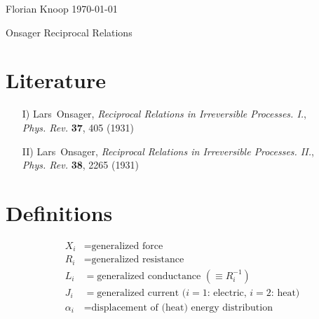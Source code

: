\documentclass[a4paper]{article}
\renewcommand{\d}{\text{d}}
\begin{document}
\noindent
Florian Knoop  \hfill \today 
\\[2em]
\begin{center}
	{\Large Onsager Reciprocal Relations}
\end{center}

\noindent

\section*{Literature}
\begin{itemize}
    \item[I)] Lars~Onsager, \emph{Reciprocal Relations in Irreversible Processes. I.}, \\
    \emph{Phys. Rev.} \textbf{37}, 405 (1931)
    \item[II)] Lars~Onsager, \emph{Reciprocal Relations in Irreversible Processes. II.}, \\
    \emph{Phys. Rev.} \textbf{38}, 2265 (1931)
\end{itemize}

\section*{Definitions}
\begin{align*}
    X_i &= \text{generalized force} \\
    R_i &= \text{generalized resistance} \\
    L_i &= \text{generalized conductance } (\equiv R_i^{-1}) \\
    J_i &= \text{generalized current ($i=1$: electric, $i=2$: heat)} \\
    \alpha_i &= \text{displacement of (heat) energy distribution} %
\end{align*}
\end{document}

